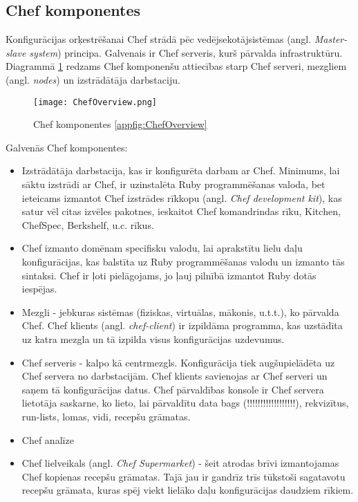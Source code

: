 \subsection{Chef komponentes}
Konfigurācijas orķestrēšanai Chef strādā pēc vedējsekotājsistēmas (angl. \textit{Master-slave system}) principa. Galvenais ir Chef serveris, kurš pārvalda infrastruktūru.
Diagrammā \ref{fig:ChefOverview} redzams Chef komponenšu attiecības starp Chef serveri, mezgliem (angl. \textit{nodes}) un izstrādātāja darbstaciju.
\begin{figure}[H]%
	\centering
	\captionsetup{justification=centering}
	\texttt{[image: ChefOverview.png]}
	\caption{Chef komponentes \ref{appfig:ChefOverview}}
	\label{fig:ChefOverview}
\end{figure}
Galvenās Chef komponentes:
\begin{itemize}
	\item Izstrādātāja darbstacija, kas ir konfigurēta darbam ar Chef. Minimums, lai sāktu izstrādi ar Chef, ir uzinstalēta Ruby programmēšanas valoda, bet ieteicams izmantot Chef izstrādes rīkkopu (angl. \textit{Chef development kit}), kas satur vēl citas izvēles pakotnes, ieskaitot Chef komandrindas rīku, Kitchen, ChefSpec, Berkshelf, u.c. rīkus.
	\item Chef izmanto domēnam specifisku valodu, lai aprakstītu lielu daļu konfigurācijas, kas balstīta uz Ruby programmēšanas valodu un izmanto tās sintaksi. Chef ir ļoti pielāgojams, jo ļauj pilnībā izmantot Ruby dotās iespējas.
	\item Mezgli - jebkuras sistēmas (fiziskas, virtuālas, mākonis, u.t.t.), ko pārvalda Chef. Chef klients (angl. \textit{chef-client}) ir izpildāma programma, kas uzstādīta uz katra mezgla un tā izpilda visus konfigurācijas uzdevumus.
	\item Chef serveris - kalpo kā centrmezgls. Konfigurācija tiek augšupielādēta uz Chef servera no darbstacijām. Chef klients savienojas ar Chef serveri un saņem tā konfigurācijas datus.
	Chef pārvaldības konsole ir Chef servera lietotāja saskarne, ko lieto, lai pārvaldītu data bags (!!!!!!!!!!!!!!!!!!), rekvizītus, run-lists, lomas, vidi, recepšu grāmatas.
	\item Chef analīze
	\item Chef lielveikals (angl. \textit{Chef Supermarket}) - šeit atrodas brīvi izmantojamas Chef kopienas recepšu grāmatas. Tajā jau ir gandrīz trīs tūkstoši sagatavotu recepšu grāmata, kuras spēj viekt lielāko daļu konfigurācijas daudziem rīkiem.
\end{itemize}




